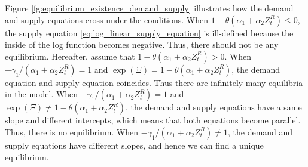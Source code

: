 \documentclass[11pt, a4paper]{article}
\begin{document}
Figure \ref{fg:equilibrium_existence_demand_supply} illustrates how the demand and supply equations cross under the conditions.
When $1- \theta(\alpha_1 + \alpha_2 Z^{R}_{t}) \le 0$, the supply equation \eqref{eq:log_linear_supply_equation} is ill-defined because the inside of the log function becomes negative.
Thus, there should not be any equilibrium.
Hereafter, assume that $1- \theta(\alpha_1 + \alpha_2 Z^{R}_{t}) > 0$.
When $-\gamma_1/(\alpha_1 + \alpha_2 Z^{R}_{t}) = 1$ and $\exp(\Xi) = 1- \theta(\alpha_1 + \alpha_2 Z^{R}_{t})$, the demand equation and supply equation coincides.
Thus there are infinitely many equilibria in the model.
When $-\gamma_1/(\alpha_1 + \alpha_2 Z^{R}_{t}) = 1$ and $\exp(\Xi) \ne 1- \theta(\alpha_1 + \alpha_2 Z^{R}_{t})$, the demand and supply equations have a same slope and different intercepts, which means that both equations become parallel.
Thus, there is no equilibrium.
When $-\gamma_1/(\alpha_1 + \alpha_2 Z^{R}_{t}) \ne 1$, the demand and supply equations have different slopes, and hence we can find a unique equilibrium. 
\end{document}
